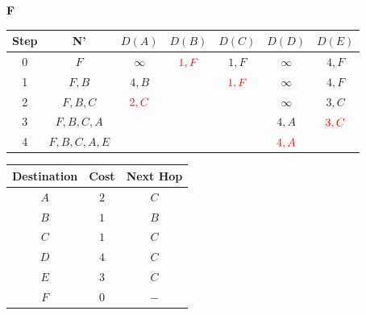 \documentclass[10pt]{article}
\begin{document}
			\begin{center}
				\textbf{F}
				\begin{tabular}{||c c c c c c c||} 
					\hline
					Step & N' & $D(A)$ & $D(B)$ & $D(C)$ & $D(D)$ & $D(E)$ \\[0.5ex] 
					\hline\hline
					0 & $F$ & $\infty$ & $\color{red} 1,F$ & $1,F$ & $\infty$ & $4,F$ \\
					\hline
					1 & $F,B$ & $4,B$ & & $\color{red} 1,F$ & $\infty$ & $4,F$ \\
					\hline
					2 & $F,B,C$& $\color{red} 2,C$ & & & $\infty$ & $3,C$ \\
					\hline
					3 & $F,B,C,A$ & & & & $4,A$ & $\color{red} 3,C$ \\
					\hline
					4 & $F,B,C,A,E$ & & & & $\color{red} 4,A$ & \\[0.5ex]  
					\hline
				\end{tabular}
				\quad
				\begin{tabular}{||c || c || c||}
					\hline
					Destination & Cost & Next Hop \\[0.5ex] 
					\hline\hline
					$A$ & $2$ & $C$ \\
					$B$ & $1$ & $B$ \\
					$C$ & $1$ & $C$ \\
					$D$ & $4$ & $C$ \\
					$E$ & $3$ & $C$ \\
					$F$ & $0$ & $-$ \\[0.5ex]
					\hline
				\end{tabular}
			\end{center}
\end{document}
